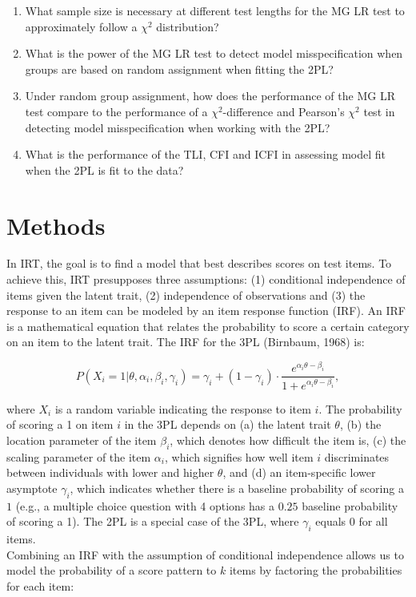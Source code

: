 \documentclass[Royal,sageapa,times,doublespace]{sagej}
\begin{document}
\begin{enumerate}
\item{What sample size is necessary at different test lengths for the MG LR test to approximately follow a $\chi^2$ distribution?}
\item{What is the power of the MG LR test to detect model misspecification when groups are based on random assignment when fitting the 2PL?}
\item{Under random group assignment, how does the performance of the MG LR test compare to the performance of a $\chi^2$-difference and Pearson's $\chi^2$ test in detecting model misspecification when working with the 2PL?}
\item{What is the performance of the TLI, CFI and ICFI in assessing model fit when the 2PL is fit to the data?}
\end{enumerate}

\section{Methods}
In IRT, the goal is to find a model that best describes scores on test items. To achieve this, IRT presupposes three assumptions: (1) conditional independence of items given the latent trait, (2) independence of observations and (3) the response to an item can be modeled by an item response function (IRF). An IRF is a mathematical equation that relates the probability to score a certain category on an item to the latent trait. The IRF for the 3PL (Birnbaum, 1968) is:

\begin{equation}
P(X_i = 1 | \theta, \alpha_{i}, \beta_{i}, \gamma_{i}) = \gamma_{i} + (1 - \gamma_{i}) \cdot 
\frac{e^{\alpha_{i}\theta - \beta_{i}}}{1 + e^{\alpha_{i}\theta - \beta_{i}}},
\end{equation}

where $X_i$ is a random variable indicating the response to item $i$. The probability of scoring a 1 on item $i$ in the 3PL depends on (a) the latent trait $\theta$, (b) the location parameter of the item $\beta_{i}$, which denotes how difficult the item is, (c) the scaling parameter of the item $\alpha_{i}$, which signifies how well item $i$ discriminates between individuals with lower and higher $\theta$, and (d) an item-specific lower asymptote $\gamma_{i}$, which indicates whether there is a baseline probability of scoring a $1$ (e.g., a multiple choice question with 4 options has a $0.25$ baseline probability of scoring a 1). The 2PL is a special case of the 3PL, where $\gamma_{i}$ equals $0$ for all items. \\
\indent Combining an IRF with the assumption of conditional independence allows us to model the probability of a score pattern to $k$ items by factoring the probabilities for each item:
\end{document}
